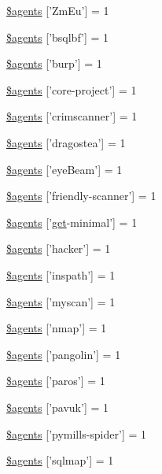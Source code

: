 \begin{DoxyCompactItemize}
\item 
\hyperlink{agents_8php_a8022879ffea5e363617b4c4141466c6f}{\$agents} \mbox{[}'Zm\-Eu'\mbox{]} = 1
\item 
\hyperlink{agents_8php_ab434a6415852b9359d21d91dc58d00e9}{\$agents} \mbox{[}'bsqlbf'\mbox{]} = 1
\item 
\hyperlink{agents_8php_a2b0d1a432fa260dbfa17d842d866e080}{\$agents} \mbox{[}'burp'\mbox{]} = 1
\item 
\hyperlink{agents_8php_a55db17ba4c3e52cde79dd997dcb1857c}{\$agents} \mbox{[}'core-\/project'\mbox{]} = 1
\item 
\hyperlink{agents_8php_ab8be0786d205b6ccbed8d2cf6e075c71}{\$agents} \mbox{[}'crimscanner'\mbox{]} = 1
\item 
\hyperlink{agents_8php_a118576335ae0affe3b3583b7a8c55be1}{\$agents} \mbox{[}'dragostea'\mbox{]} = 1
\item 
\hyperlink{agents_8php_a1a9d4edac8bb3c46d86eaca6e270bff3}{\$agents} \mbox{[}'eye\-Beam'\mbox{]} = 1
\item 
\hyperlink{agents_8php_a4ffde91813d5faba7d3c4a87bf9daa10}{\$agents} \mbox{[}'friendly-\/scanner'\mbox{]} = 1
\item 
\hyperlink{agents_8php_ab4a257059c1263f1c3226a86e954c5c2}{\$agents} \mbox{[}'\hyperlink{classget}{get}-\/minimal'\mbox{]} = 1
\item 
\hyperlink{agents_8php_a5fb0796a21129000bed87b4ced944fef}{\$agents} \mbox{[}'hacker'\mbox{]} = 1
\item 
\hyperlink{agents_8php_a0c72a2087f83f48a88b49da898e11dcd}{\$agents} \mbox{[}'inspath'\mbox{]} = 1
\item 
\hyperlink{agents_8php_ad0c709c6e691cf5a1dc87885d905a6b3}{\$agents} \mbox{[}'myscan'\mbox{]} = 1
\item 
\hyperlink{agents_8php_a9ba59d72c6261e8255de0d19ea304c0f}{\$agents} \mbox{[}'nmap'\mbox{]} = 1
\item 
\hyperlink{agents_8php_ab0821e3b43c8905694a07364bf593f2c}{\$agents} \mbox{[}'pangolin'\mbox{]} = 1
\item 
\hyperlink{agents_8php_ac9d01a024216076bd833b147eb7a875d}{\$agents} \mbox{[}'paros'\mbox{]} = 1
\item 
\hyperlink{agents_8php_af7f656bf1d9dba88f9f2f564e51b9ee9}{\$agents} \mbox{[}'pavuk'\mbox{]} = 1
\item 
\hyperlink{agents_8php_af0a68ce87585d4350c0680a04915f531}{\$agents} \mbox{[}'pymills-\/spider'\mbox{]} = 1
\item 
\hyperlink{agents_8php_ad1494dc4533e5ad2df97370dc3262733}{\$agents} \mbox{[}'sqlmap'\mbox{]} = 1

\end{DoxyCompactItemize}
